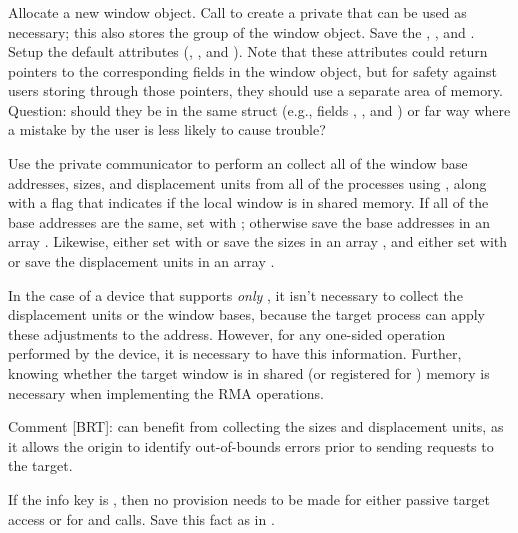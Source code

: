\documentclass{article}
\begin{document}
\subsubsection{}
Allocate a new window object.  Call  to create a
private  that can be used as necessary; this also stores
the group of the window object.  Save the ,
, and . 
Setup the default attributes (,
, and ).  Note that these
attributes could return pointers to the corresponding fields in the window
object, but for safety against users storing through those pointers, they
should use a separate area of memory.  Question: should they be in the same
struct (e.g., fields , ,
and ) or far way where a mistake by the user is
less likely to cause trouble?

Use the private communicator to perform an 
collect all of the window base addresses, sizes, and displacement
units from all of the processes using , along
with a flag that indicates if the local window is in shared memory.
If all of the base addresses are the same, set 
with ; otherwise save the base
addresses in an array .  Likewise, either set
 with  or save
the sizes in an array , and either set
 with  or save
the displacement units in an array .

In the case of a device that supports \emph{only} \tcpname, it isn't
necessary to collect the displacement units or the window bases,
because the target process can apply these adjustments to the
address.  However, for any one-sided operation performed by the device, it is
necessary to 
have this information.  Further, knowing whether the target window is
in shared (or registered for \vianame) memory is necessary when
implementing the RMA operations.

Comment [BRT]: \tcpname can benefit from collecting the sizes and
displacement units, as it allows the origin to identify out-of-bounds
errors prior to sending requests to the target.

If the info key  is ,
then no provision needs to be made for either passive target access or for
 and  calls.  Save this
fact as  in .
\end{document}
